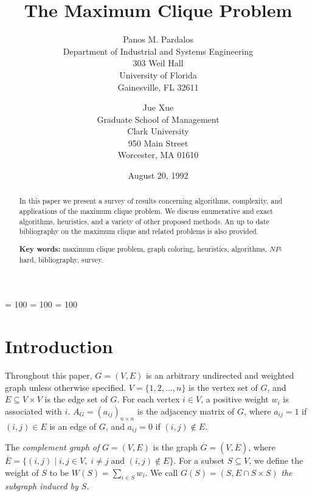 \clubpenalty = 100
\widowpenalty = 100
\interlinepenalty = 100
\raggedbottom

\newcommand{\drawline}{\rule{4.5in}{.4mm}}
\newtheorem{lem}{Lemma}[section]
\newtheorem{thm}{Theorem}[section]


\title{The Maximum Clique Problem}
\author{Panos M. Pardalos \\
Department of Industrial and Systems Engineering \\
303 Weil Hall \\
University of Florida \\
Gainesville, FL 32611 \\
 \and Jue Xue \\Graduate School of Management\\
Clark University \\
950 Main Street\\
 Worcester, MA 01610}
\date{August 20, 1992}
\maketitle
\begin{abstract}
In this paper we present a survey of results concerning algorithms,
complexity, and applications of the maximum clique problem. We
discuss enumerative and exact algorithms, heuristics, and a variety
of other proposed methods. An up to date bibliography on the maximum
clique and related problems is also provided.

{\bf Key words:} maximum clique problem, graph coloring, heuristics,
algorithms, $NP$-hard, bibliography, survey.
\end{abstract}


\section{Introduction}

Throughout this paper, $G = (V,E)$ is an arbitrary undirected and
weighted graph unless otherwise specified. $V = \{1,2,\ldots,n \}$
is the vertex set of $G$, and $E \subseteq V \times V$ is the edge
set of $G$. For each vertex $i \in V$, a positive weight $w_i$ is
associated with $i$. $A_G=(a_{ij})_{n \times n}$ is the adjacency
matrix of $G$, where $a_{ij} = 1$ if $(i,j) \in E$ is an edge of
$G$, and $a_{ij}=0$ if $(i,j) \notin E$.

The {\em complement graph of} $G = (V,E)$ is the graph
$\overline{G} = (V,\overline{E})$, where
$\overline{E} = \{(i,j) \; | \; i,j \in V, \; i \neq j \;
 \mbox{and } (i,j) \notin E \}$.
For a subset $S \subseteq V$, we define the weight of $S$ to be
$W(S) = \sum_{i \in S} w_i$. We call
$G(S) = (S, E \cap S \times S)$ {\em the subgraph induced by $S$}.

